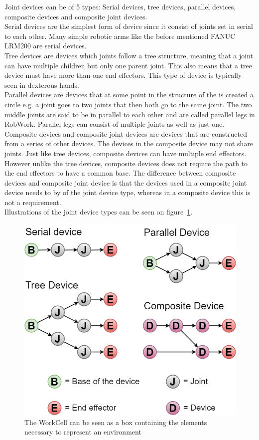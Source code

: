 Joint devices can be of 5 types: Serial devices, tree devices, parallel devices, composite devices and composite joint devices.\\
Serial devices are the simplest form of device since it consist of joints set in serial to each other. Many simple robotic arms like the before mentioned FANUC LRM200 are serial devices.\\
Tree devices are devices which joints follow a tree structure, meaning that a joint can have multiple children but only one parent joint. This also means that a tree device must have more than one end effectors. This type of device is typically seen in dexterous hands.\\
Parallel devices are devices that at some point in the structure of the is created a circle e.g. a joint goes to two joints that then both go to the same joint. The two middle joints are said to be in parallel to each other and are called parallel legs in RobWork. Parallel legs can consist of multiple joints as well as just one.\\
Composite devices and composite joint devices are devices that are constructed from a series of other devices. The devices in the composite device may not share joints. Just like tree devices, composite devices can have multiple end effectors. However unlike the tree devices, composite devices does not require the path to the end effectors to have a common base. The difference between composite devices and composite joint device is that the devices used in a composite joint device needs to by of the joint device type, whereas in a composite device this is not a requirement.\\
Illustrations of the joint device types can be seen on figure~\ref{fig:DeviceTypes}.

\begin{figure}[h]
	\centering
	\includegraphics[scale=0.55]{Figures/DeviceTypes.png}
	\caption{The WorkCell can be seen as a box containing the elements necessary to represent an environment}
	\label{fig:DeviceTypes}
\end{figure}


